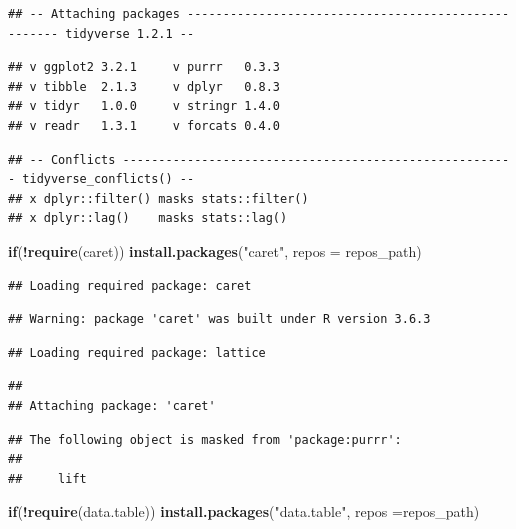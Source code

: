 \documentclass[]{article}
\newenvironment{Shaded}{\begin{snugshade}}{\end{snugshade}}
\newcommand{\ControlFlowTok}[1]{\textcolor[rgb]{0.13,0.29,0.53}{\textbf{#1}}}
\newcommand{\DataTypeTok}[1]{\textcolor[rgb]{0.13,0.29,0.53}{#1}}
\newcommand{\KeywordTok}[1]{\textcolor[rgb]{0.13,0.29,0.53}{\textbf{#1}}}
\newcommand{\NormalTok}[1]{#1}
\newcommand{\OperatorTok}[1]{\textcolor[rgb]{0.81,0.36,0.00}{\textbf{#1}}}
\newcommand{\StringTok}[1]{\textcolor[rgb]{0.31,0.60,0.02}{#1}}
\begin{document}
\begin{verbatim}
## -- Attaching packages ---------------------------------------------------- tidyverse 1.2.1 --
\end{verbatim}

\begin{verbatim}
## v ggplot2 3.2.1     v purrr   0.3.3
## v tibble  2.1.3     v dplyr   0.8.3
## v tidyr   1.0.0     v stringr 1.4.0
## v readr   1.3.1     v forcats 0.4.0
\end{verbatim}

\begin{verbatim}
## -- Conflicts ------------------------------------------------------- tidyverse_conflicts() --
## x dplyr::filter() masks stats::filter()
## x dplyr::lag()    masks stats::lag()
\end{verbatim}

\begin{Shaded}
\begin{Highlighting}[]
\ControlFlowTok{if}\NormalTok{(}\OperatorTok{!}\KeywordTok{require}\NormalTok{(caret)) }\KeywordTok{install.packages}\NormalTok{(}\StringTok{"caret"}\NormalTok{, }\DataTypeTok{repos =}\NormalTok{ repos_path)}
\end{Highlighting}
\end{Shaded}

\begin{verbatim}
## Loading required package: caret
\end{verbatim}

\begin{verbatim}
## Warning: package 'caret' was built under R version 3.6.3
\end{verbatim}

\begin{verbatim}
## Loading required package: lattice
\end{verbatim}

\begin{verbatim}
## 
## Attaching package: 'caret'
\end{verbatim}

\begin{verbatim}
## The following object is masked from 'package:purrr':
## 
##     lift
\end{verbatim}

\begin{Shaded}
\begin{Highlighting}[]
\ControlFlowTok{if}\NormalTok{(}\OperatorTok{!}\KeywordTok{require}\NormalTok{(data.table)) }\KeywordTok{install.packages}\NormalTok{(}\StringTok{"data.table"}\NormalTok{, }\DataTypeTok{repos =}\NormalTok{repos_path)}
\end{Highlighting}
\end{Shaded}
\end{document}
